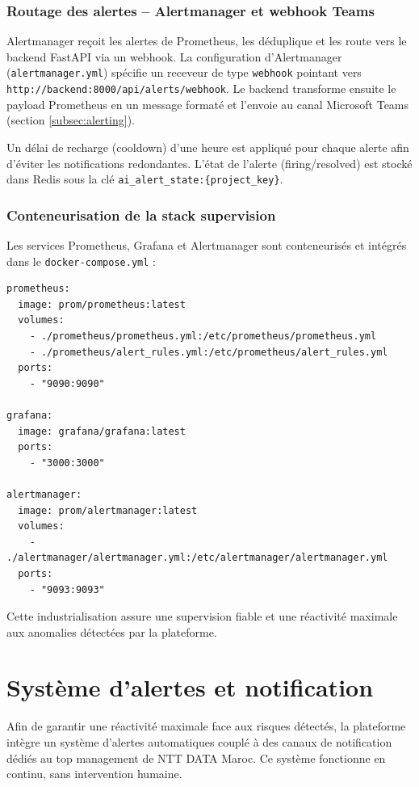 \subsubsection{Routage des alertes – Alertmanager et webhook Teams}

Alertmanager reçoit les alertes de Prometheus, les déduplique et les route vers le backend FastAPI via un webhook. La configuration d'Alertmanager (\texttt{alertmanager.yml}) spécifie un receveur de type \texttt{webhook} pointant vers \texttt{http://backend:8000/api/alerts/webhook}. Le backend transforme ensuite le payload Prometheus en un message formaté et l'envoie au canal Microsoft Teams (section \ref{subsec:alerting}).

Un délai de recharge (cooldown) d'une heure est appliqué pour chaque alerte afin d'éviter les notifications redondantes. L'état de l'alerte (firing/resolved) est stocké dans Redis sous la clé \texttt{ai\_alert\_state:\{project\_key\}}.

\subsubsection{Conteneurisation de la stack supervision}

Les services Prometheus, Grafana et Alertmanager sont conteneurisés et intégrés dans le \texttt{docker-compose.yml} :

\begin{verbatim}
prometheus:
  image: prom/prometheus:latest
  volumes:
    - ./prometheus/prometheus.yml:/etc/prometheus/prometheus.yml
    - ./prometheus/alert_rules.yml:/etc/prometheus/alert_rules.yml
  ports:
    - "9090:9090"

grafana:
  image: grafana/grafana:latest
  ports:
    - "3000:3000"

alertmanager:
  image: prom/alertmanager:latest
  volumes:
    - ./alertmanager/alertmanager.yml:/etc/alertmanager/alertmanager.yml
  ports:
    - "9093:9093"
\end{verbatim}

Cette industrialisation assure une supervision fiable et une réactivité maximale aux anomalies détectées par la plateforme.

\section{Système d’alertes et notification}
Afin de garantir une réactivité maximale face aux risques détectés, la plateforme intègre un système d’alertes automatiques couplé à des canaux de notification dédiés au top management de NTT DATA Maroc. Ce système fonctionne en continu, sans intervention humaine.

